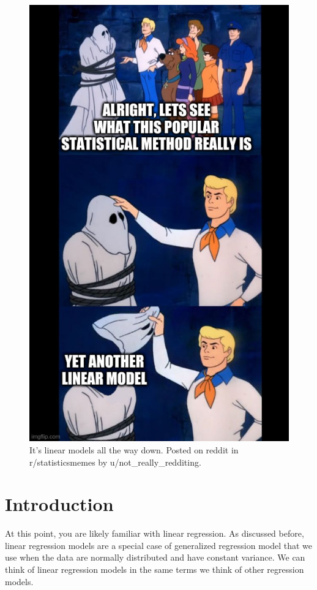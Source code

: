 \documentclass[
]{book}
\begin{document}
\begin{figure}
\centering
\includegraphics{images/scooby_doo_meme.jpg}
\caption{It's linear models all the way down. Posted on reddit in r/statisticsmemes by u/not\_really\_redditing.}
\end{figure}

\hypertarget{introduction}{%
\section{Introduction}\label{introduction}}

At this point, you are likely familiar with linear regression. As discussed before, linear regression models are a special case of generalized regression model that we use when the data are normally distributed and have constant variance. We can think of linear regression models in the same terms we think of other regression models.
\end{document}
